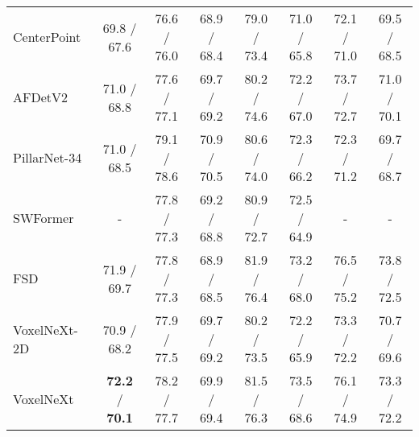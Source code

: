 \documentclass[10pt,twocolumn,letterpaper]{article}
\begin{document}
{\begin{table*}[t]
\begin{center}
{\begin{tabular}{|l|c|cc|cc|cc|}
CenterPoint~\cite{centerpoint}                                    & 69.8 / 67.6 & 76.6 / 76.0     & 68.9 / 68.4    & 79.0 / 73.4      & 71.0 / 65.8      & 72.1 / 71.0     & 69.5 / 68.5    \\
AFDetV2~\cite{afdetv2}                                        & 71.0 / 68.8 & 77.6 / 77.1     & 69.7 / 69.2    & 80.2 / 74.6      & 72.2 / 67.0      & 73.7 / 72.7     & 71.0 / 70.1    \\
PillarNet-34~\cite{pillarnet}                                   & 71.0 / 68.5 & {79.1} / {78.6}     & {70.9} / {70.5}    & 80.6 / 74.0      & 72.3 / 66.2      & 72.3 / 71.2     & 69.7 / 68.7    \\
SWFormer~\cite{swformer}                                       & -         & 77.8 / 77.3     & 69.2 / 68.8    & 80.9 / 72.7      & 72.5 / 64.9      & -             & -            \\ 
FSD~\cite{fsd}                                      & 71.9 / 69.7 & 77.8 / 77.3     & 68.9 / 68.5    & 81.9 / 76.4      & 73.2 / 68.0      & 76.5 / 75.2     & 73.8 / 72.5    \\
\hline
VoxelNeXt-2D            &    70.9 / 68.2       & 77.9 / 77.5     & 69.7 / 69.2    & 80.2 / 73.5      & 72.2 / 65.9      & 73.3 / 72.2     & 70.7 / 69.6    \\
VoxelNeXt    &    \textbf{72.2} / \textbf{70.1}       & 78.2 / 77.7     & 69.9 / 69.4    & 81.5 / 76.3      & 73.5 / 68.6      & 76.1 / 74.9     & 73.3 / 72.2    \\
\hline
\end{tabular}
}
\label{tab:waymo-val}
\end{center}
\end{table*}
\begin{table*}[t]
\begin{center}
\caption{Performance of 3D object detection results Argoverse2 dataset.}
\vspace{-5pt}
\end{center}
\end{table*}}
\end{document}
